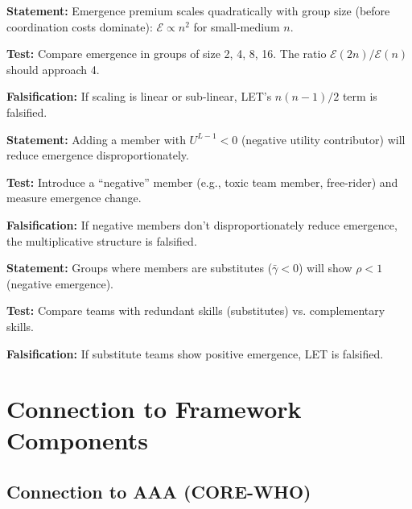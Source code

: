 \begin{tcolorbox}[colback=green!5!white, colframe=green!75!black,
    title=Prediction LET-P2: Quadratic Scaling]
\textbf{Statement:} Emergence premium scales quadratically with group size
(before coordination costs dominate):
$\mathcal{E} \propto n^2$ for small-medium $n$.

\textbf{Test:} Compare emergence in groups of size 2, 4, 8, 16. The
ratio $\mathcal{E}(2n)/\mathcal{E}(n)$ should approach 4.

\textbf{Falsification:} If scaling is linear or sub-linear, LET's
$n(n-1)/2$ term is falsified.
\end{tcolorbox}

\begin{tcolorbox}[colback=green!5!white, colframe=green!75!black,
    title=Prediction LET-P3: Negative Member Effect]
\textbf{Statement:} Adding a member with $U^{L-1} < 0$ (negative utility
contributor) will reduce emergence disproportionately.

\textbf{Test:} Introduce a ``negative'' member (e.g., toxic team member,
free-rider) and measure emergence change.

\textbf{Falsification:} If negative members don't disproportionately
reduce emergence, the multiplicative structure is falsified.
\end{tcolorbox}

\begin{tcolorbox}[colback=green!5!white, colframe=green!75!black,
    title=Prediction LET-P4: Substitutes Destroy Emergence]
\textbf{Statement:} Groups where members are substitutes ($\bar{\gamma} < 0$)
will show $\rho < 1$ (negative emergence).

\textbf{Test:} Compare teams with redundant skills (substitutes) vs.
complementary skills.

\textbf{Falsification:} If substitute teams show positive emergence,
LET is falsified.
\end{tcolorbox}


\section{Connection to Framework Components}
\label{sec:let-connections}

\subsection{Connection to AAA (CORE-WHO)}

